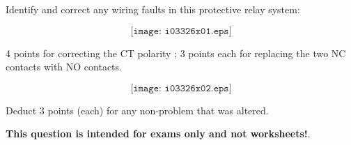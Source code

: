 

Identify and correct any wiring faults in this protective relay system:

$$\texttt{[image: i03326x01.eps]}$$







4 points for correcting the CT polarity ; 3 points each for replacing the two NC contacts with NO contacts.

$$\texttt{[image: i03326x02.eps]}$$

Deduct 3 points (each) for any non-problem that was altered.







{\bf This question is intended for exams only and not worksheets!}.



